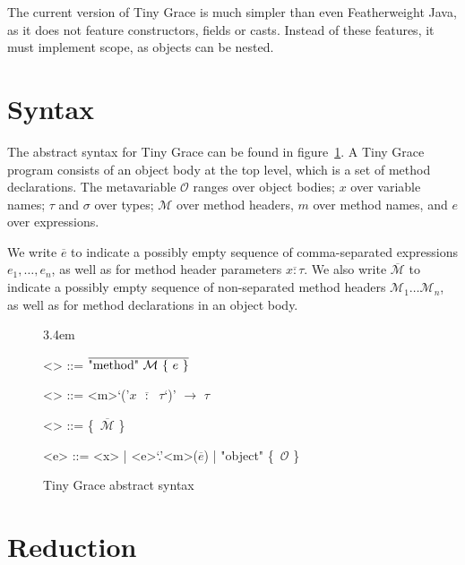 \documentclass[a4paper, 11pt]{article}
\def\M{\mathcal{M}}
\def\O{\mathcal{O}}
\def\bo{{\sffamily\{}}
\def\bc{{\sffamily\}}}
\begin{document}
\noindent The current version of Tiny Grace is much simpler than even
Featherweight Java, as it does not feature constructors, fields or casts.
Instead of these features, it must implement scope, as objects can be nested.


\section{Syntax}

\def\*#1*{$\overline{#1}$}

The abstract syntax for Tiny Grace can be found in
figure~\ref{fig:abstract-syntax}.  A Tiny Grace program consists of an object
body at the top level, which is a set of method declarations.  The metavariable
$\O$ ranges over object bodies; $x$ over variable names; $\tau$ and $\sigma$ over
types; $\M$ over method headers, $m$ over method names, and $e$ over expressions.

We write \*e* to indicate a possibly empty sequence of comma-separated
expressions $e_1, \dots, e_n$, as well as for method header parameters \*x :
\tau*.  We also write \*\M* to indicate a possibly empty sequence of
non-separated method headers $\M_1 \dots \M_n$, as well as for method declarations
in an object body.

\begin{figure}

\def\*#1*{$\overline{\text{#1}}$}
\def\<#1>{$#1$}

\grammarindent3.4em
\renewcommand{\grammarlabel}[2]{$#1$\hfill#2}
\renewcommand{\syntleft}{\itshape}
\renewcommand{\syntright}{}
\renewcommand{\ulitleft}{\sffamily\bfseries}
\renewcommand{\litleft}{\sffamily}
\renewcommand{\litright}{}

\begin{grammar}
<\O> ::= \*"method" $\M$ \bo~\<e> \bc*

<\M> ::= <m>`('\*\<x> $:$ $\tau$*`)' $\to$ $\tau$

<\tau> ::= \bo~\*$\M$* \bc

<e> ::= <x> | <e>`.'<m>(\*\<e>*) | "object" \bo~$\O$ \bc
\end{grammar}

\label{fig:abstract-syntax}

\caption{Tiny Grace abstract syntax}

\end{figure}


\section{Reduction}
\end{document}

